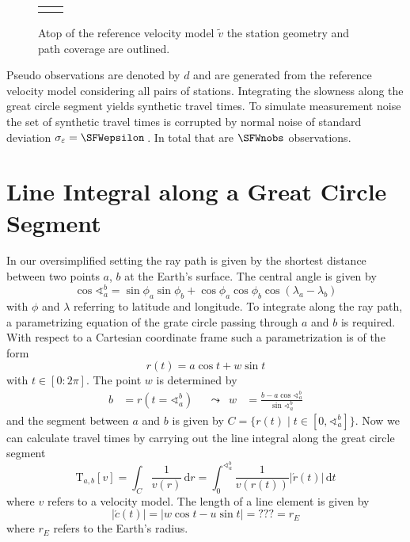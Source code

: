 \documentclass[11pt]{article}
\begin{document}
\begin{figure}
    \centering
    \begin{tabular}{p{}p{}}
    \vspace{0pt}  &
    \vspace{0pt} 
    \end{tabular}
    \caption{Atop of the reference velocity model $\tilde v$ the station geometry and path coverage are outlined. }
    \label{fig:path_coverage}
\end{figure}

Pseudo observations are denoted by $d$ and are generated from the reference velocity model considering all pairs of stations.
Integrating the slowness along the great circle segment yields synthetic travel times.
To simulate measurement noise the set of synthetic travel times is corrupted by normal noise of standard deviation $\sigma_\varepsilon = \SFWepsilon$\,.
In total that are $\SFWnobs$ observations.


\section{Line Integral along a Great Circle Segment}

In our oversimplified setting the ray path is given by the shortest distance between two points $a$, $b$ at the Earth's surface.
The central angle is given by
\begin{equation}
    \cos \sphericalangle_a^b %
    = \sin\phi_a\sin\phi_b + \cos\phi_a\cos\phi_b \cos(\lambda_a - \lambda_b)
\end{equation}
with $\phi$ and $\lambda$ referring to latitude and longitude.
To integrate along the ray path, a parametrizing equation of the grate circle passing through $a$ and $b$ is required.
With respect to a Cartesian coordinate frame such a parametrization is of the form
\begin{equation}
    r(t) = a \cos t + w \sin t
\end{equation}
with $t \in [0:2\pi]$.
The point $w$ is determined by
\begin{align}
    b &= r(t = \sphericalangle_a^b) &
    &\leadsto &
    w &= \frac{b - a \cos \sphericalangle_a^b}{\sin \sphericalangle_a^b}
\end{align}
and the segment between $a$ and $b$ is given by $C= \{r(t) \mid t \in [0, \sphericalangle_a^b]\}$.
%
Now we can calculate travel times by carrying out the line integral along the great circle segment
\begin{equation}
    \mathrm T_{a,b}[v]
    = \int_C \frac1{v(r)} \, \mathrm d r
    = \int_0^{\sphericalangle_a^b} \frac 1{v(r(t))} |\acute r(t)| \, \mathrm d t
\end{equation}
where $v$ refers to a velocity model.
The length of a line element is given by
\begin{equation}
    |\acute c(t)| = |w \cos t - u \sin t| = ??? = r_E
\end{equation}
where $r_E$ refers to the Earth's radius.
\end{document}
